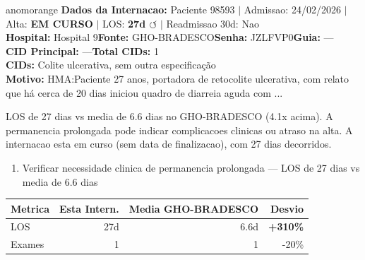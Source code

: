 \documentclass[a4paper,10pt]{article}
\begin{document}
\begin{anomalycard}[Internacao 118873 | GHO-BRADESCO | ALTO (z=3.90)]{anomorange}
\textbf{Dados da Internacao:} Paciente 98593 $\mid$ Admissao: 24/02/2026 $\mid$ Alta: \textcolor{anomorange}{\textbf{EM CURSO}} $\mid$ LOS: \textbf{27d \textcolor{anomorange}{$\circlearrowleft$}} $\mid$ Readmissao 30d: Nao\\
\textbf{Hospital:} Hospital 9\quad\textbf{Fonte:} GHO-BRADESCO\quad\textbf{Senha:} JZLFVP0\quad\textbf{Guia:} ---\\
\textbf{CID Principal:} {\small ---}\quad\textbf{Total CIDs:} 1\\

\textbf{CIDs:} {\scriptsize Colite ulcerativa, sem outra especificação}\\

\textbf{Motivo:} {\scriptsize HMA:Paciente 27 anos, portadora de retocolite ulcerativa, com relato que há cerca de 20 dias iniciou quadro de diarreia aguda com ...}\\

\vspace{2pt}\begin{tcolorbox}[colback=severityred!20,colframe=anomorange,title={\textbf{Interpretacao de Negocio}},fonttitle=\bfseries\small,left=4pt,right=4pt,top=3pt,bottom=3pt]
{\small LOS de 27 dias vs media de 6.6 dias no GHO-BRADESCO (4.1x acima). A permanencia prolongada pode indicar complicacoes clinicas ou atraso na alta. A internacao esta em curso (sem data de finalizacao), com 27 dias decorridos.}
\end{tcolorbox}
\begin{tcolorbox}[colback=severityyellow!30,colframe=anomorange,title={\textbf{Recomendacoes Especificas}},fonttitle=\bfseries\small,left=4pt,right=4pt,top=3pt,bottom=3pt]
\begin{enumerate}[nosep,leftmargin=16pt]
\item {\small Verificar necessidade clinica de permanencia prolongada --- LOS de 27 dias vs media de 6.6 dias}
\end{enumerate}
\end{tcolorbox}
\begin{center}\begin{tabular}{l r r r}\toprule\textbf{Metrica} & \textbf{Esta Intern.} & \textbf{Media GHO-BRADESCO} & \textbf{Desvio} \\\midrule
LOS & 27d & 6.6d & \textcolor{anomred}{\textbf{+310\%}} \\
Exames & 1 & 1 & -20\% \\
\bottomrule\end{tabular}\end{center}


\end{anomalycard}
\end{document}
